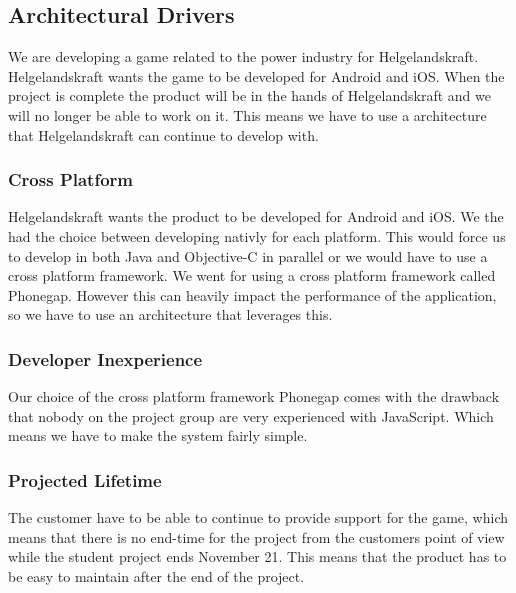 \subsection{Architectural Drivers}
We are developing a game related to the power industry for Helgelandskraft. Helgelandskraft wants the game to be developed for Android and iOS. When the project is complete the product will be in the hands of Helgelandskraft and we will no longer be able to work on it. This means we have to use a architecture that Helgelandskraft can continue to develop with.

\subsubsection{Cross Platform}
Helgelandskraft wants the product to be developed for Android and iOS. We the had the choice between developing nativly for each platform. This would force us to develop in both Java and Objective-C in parallel or we would have to use a cross platform framework. We went for using a cross platform framework called Phonegap. However this can heavily impact the performance of the application, so we have to use an architecture that leverages this.

\subsubsection{Developer Inexperience}
Our choice of the cross platform framework Phonegap comes with the drawback that nobody on the project group are very experienced with JavaScript. Which means we have to make the system fairly simple.

\subsubsection{Projected Lifetime}
The customer have to be able to continue to provide support for the game, which means that there is no end-time for the project from the customers point of view while the student project ends November 21. This means that the product has to be easy to maintain after the end of the project.
